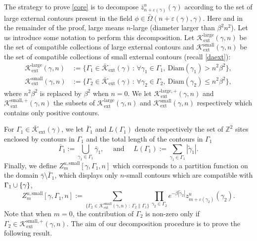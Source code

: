 \documentclass[JEP,XML,SOM,Unicode, NoFloatCountersInSection]{cedram}
\let\mathcal\mathscr
\newcommand{\sep}{\,:\,}
\numberwithin{equation}{section}
\theoremstyle{plain}
\theoremstyle{definition}
\newcommand{\ext}{\mathrm{ext}}
\newcommand{\sm}{\mathrm{small}}
\newcommand{\Diam}{\mathrm{Diam}}
\newcommand{\larg}{\mathrm{large}}
\newcommand{\cK}{{\ensuremath{\mathcal K}} }
\newcommand{\bbZ}{{\ensuremath{\mathbb Z}} }
\newcommand{\gb}{\beta}
\newcommand{\gep}{\varepsilon}
\newcommand{\gG}{\Gamma}
\newcommand{\gO}{\Omega}
\begin{document}
The strategy to prove \eqref{core} is to decompose $\bar z^u_{n+\gep(\gamma)}(\gamma)$ according to the set
of large external contours present in the field $\phi \in \bar \gO(n+\gep(\gamma),\gamma)$.
Here and in the remainder of the proof, large means $n$-large (diameter larger than $\gb^2n^2$). Let us introduce some notation to perform this decomposition.
Let $\cK^{\larg}_{\ext}(\gamma,n)$ be the set of compatible collections of large external contours and $\cK^{\sm}_{\ext}(\gamma,n)$ be
the set of compatible collections of small external contours (recall \eqref{daext}):
\begin{equation}\label{smallandbig}
\begin{split}
\cK^{\larg}_{\ext}(\gamma,n)&:= \{ \gG_1 \in \bar \cK_{\ext}(\gamma) \sep \forall \gamma_1\in \gG_1,\ \Diam(\gamma_1)>n^2\gb^2\},\\
\cK^{\sm}_{\ext}(\gamma,n)&:= \{ \gG_2 \in \bar \cK_{\ext}(\gamma) \sep \forall \gamma_2\in \gG_2,\ \Diam(\gamma_2)\le n^2\gb^2\},
\end{split}
\end{equation}
where $n^2\gb^2$ is replaced by $\gb^2$ when $n=0$.
We let $\cK^{\larg,+}_{\ext}(\gamma,n)$ and $\cK^{\sm,+}_{\ext}(\gamma,n)$ the subsets of $\cK^{\larg}_{\ext}(\gamma,n)$ and $\cK^{\sm}_{\ext}(\gamma,n)$ respectively
which contains only positive contours.

For $\gG_1\in \bar \cK_{\ext}(\gamma)$, we let $\bar \gG_1$ and $L(\gG_1)$ denote respectively the set of $\bbZ^2$ sites
enclosed by contours in $\gG_1$ and the total length
of the contours in $\gG_1$
\begin{equation}\label{interiors}
\bar \gG_1:=\bigcup_{\gamma_1\in \gG_1} \bar \gamma_1, \quad \text{ and }\quad L(\gG_1):=\sum_{\gamma_1\in \gG_1} |\tilde \gamma_1|.
\end{equation}
Finally, we define $Z^{u,\sm}_{m}[\gamma,\gG_1,n]$ which corresponds to a partition function on the domain
$\bar \gamma \setminus \bar \gG_1$,
which displays only $n$-small contours which are
compatible with $\gG_1\cup\nobreak \{\gamma\}$,%
\begin{equation*}%
Z^{u,\sm}_{m}[\gamma,\gG_1,n]:= \sum_{ \{\gG_2 \in \cK^{\sm}_{\ext}(\gamma,n) \sep \gG_2 \parallel \gG_1\}} \prod_{\gamma_2\in \gG_2 } e^{-\gb |\tilde\gamma_2|}
z^u_{m+\gep(\gamma_2)}(\gamma_2).
\end{equation*}
Note that when $m=0$, the contribution of $\gG_2$ is non-zero only if $\gG_2 \in \cK^{\sm,+}_{\ext}(\gamma,n)$.
The aim of our decomposition procedure is to prove the following result.
\end{document}

